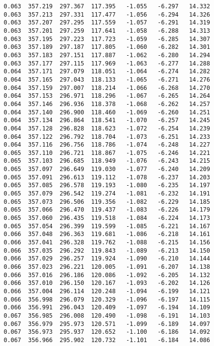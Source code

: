 \begin{verbatim}
   0.063  357.219  297.367  117.395   -1.055   -6.297   14.332
   0.063  357.213  297.331  117.477   -1.056   -6.294   14.326
   0.063  357.207  297.295  117.559   -1.057   -6.291   14.319
   0.063  357.201  297.259  117.641   -1.058   -6.288   14.313
   0.063  357.195  297.223  117.723   -1.059   -6.285   14.307
   0.063  357.189  297.187  117.805   -1.060   -6.282   14.301
   0.063  357.183  297.151  117.887   -1.062   -6.280   14.294
   0.063  357.177  297.115  117.969   -1.063   -6.277   14.288
   0.064  357.171  297.079  118.051   -1.064   -6.274   14.282
   0.064  357.165  297.043  118.133   -1.065   -6.271   14.276
   0.064  357.159  297.007  118.214   -1.066   -6.268   14.270
   0.064  357.153  296.971  118.296   -1.067   -6.265   14.264
   0.064  357.146  296.936  118.378   -1.068   -6.262   14.257
   0.064  357.140  296.900  118.460   -1.069   -6.260   14.251
   0.064  357.134  296.864  118.541   -1.070   -6.257   14.245
   0.064  357.128  296.828  118.623   -1.072   -6.254   14.239
   0.064  357.122  296.792  118.704   -1.073   -6.251   14.233
   0.064  357.116  296.756  118.786   -1.074   -6.248   14.227
   0.065  357.110  296.721  118.867   -1.075   -6.246   14.221
   0.065  357.103  296.685  118.949   -1.076   -6.243   14.215
   0.065  357.097  296.649  119.030   -1.077   -6.240   14.209
   0.065  357.091  296.613  119.112   -1.078   -6.237   14.203
   0.065  357.085  296.578  119.193   -1.080   -6.235   14.197
   0.065  357.079  296.542  119.274   -1.081   -6.232   14.191
   0.065  357.073  296.506  119.356   -1.082   -6.229   14.185
   0.065  357.066  296.470  119.437   -1.083   -6.226   14.179
   0.065  357.060  296.435  119.518   -1.084   -6.224   14.173
   0.065  357.054  296.399  119.599   -1.085   -6.221   14.167
   0.066  357.048  296.363  119.681   -1.086   -6.218   14.161
   0.066  357.041  296.328  119.762   -1.088   -6.215   14.156
   0.066  357.035  296.292  119.843   -1.089   -6.213   14.150
   0.066  357.029  296.257  119.924   -1.090   -6.210   14.144
   0.066  357.023  296.221  120.005   -1.091   -6.207   14.138
   0.066  357.016  296.186  120.086   -1.092   -6.205   14.132
   0.066  357.010  296.150  120.167   -1.093   -6.202   14.126
   0.066  357.004  296.114  120.248   -1.094   -6.199   14.121
   0.066  356.998  296.079  120.329   -1.096   -6.197   14.115
   0.066  356.991  296.043  120.409   -1.097   -6.194   14.109
   0.067  356.985  296.008  120.490   -1.098   -6.191   14.103
   0.067  356.979  295.973  120.571   -1.099   -6.189   14.097
   0.067  356.973  295.937  120.652   -1.100   -6.186   14.092
   0.067  356.966  295.902  120.732   -1.101   -6.184   14.086

\end{verbatim}
